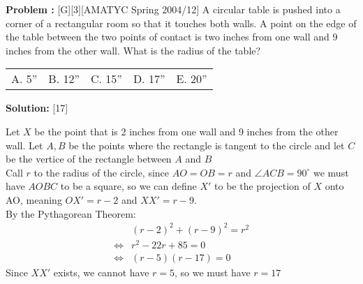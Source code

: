 \documentclass[12pt]{article}
\makeatletter
\newcounter{problem}
\newenvironment{problem}{%
    \stepcounter{problem}
    \noindent\textbf{Problem \theproblem:}%
}{%
    \par
}
\newenvironment{solution}{%
    \vspace{1em} %
    \noindent\textbf{Solution:}%
}{%
    \par
}
\newcommand{\multChoice}[5]{%
    \begin{tabular}{l @{\hskip 1.5cm} l @{\hskip 1.5cm} l @{\hskip 1.5cm} l @{\hskip 1.5cm} l}
    A. #1 & B. #2 & C. #3 & D. #4 & E. #5
\end{tabular}
}
\makeatother
\begin{document}
\begin{problem}[G][3][AMATYC Spring 2004/12]
   A circular table is pushed into a corner of a rectangular room so that it touches both walls. A point on the edge of the table between the two points of contact is two inches from one wall and 9 inches from the other wall. What is the radius of the table? 
\end{problem}
\multChoice{5''}{12''}{15''}{17''}{20''}
\begin{solution}[17]
   \begin{center}
      \end{center}
      
    Let $X$ be the point that is 2 inches from one wall and 9 inches from the other wall.
    Let $A,B$ be the points where the rectangle is tangent to the circle and let $C$
    be the vertice of the rectangle between $A$ and $B$ \\
    Call $r$ to the radius of the circle, since $AO=OB=r$ and $\angle ACB = 90^\circ$ we
    must have $AOBC$ to be a square, so we can define $X'$ to be the projection of $X$ onto 
    AO, meaning $OX'=r-2$ and $XX'=r-9$. \\
    By the Pythagorean Theorem:
    \begin{align*}
        &(r-2)^2 + (r-9)^2 = r^2 \\
        \iff& r^2-22r+85=0 \\
        \iff& (r-5)(r-17)=0
    \end{align*}
    Since $XX'$ exists, we cannot have $r=5$, so we must have $r=17$
\end{solution}
\end{document}
